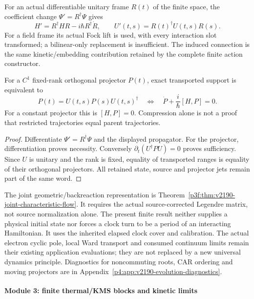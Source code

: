 \documentclass[12pt,a4paper]{article}
\begin{document}
\begin{corollary}
\label{p4:cor:v2190-frame-constraint-transport}
For an actual differentiable unitary frame \(R(t)\) of the finite space,
the coefficient change \(\Psi'=R^\dagger\Psi\) gives
\[
 H'=R^\dagger HR-i\hbar R^\dagger\dot R,
 \qquad U'(t,s)=R(t)^\dagger U(t,s)R(s).
\]
For a field frame its actual Fock lift is used, with every interaction slot
transformed; a bilinear-only replacement is insufficient.  The induced
connection is the same kinetic/embedding contribution retained by the
complete finite action constructor.

For a \(C^1\) fixed-rank orthogonal projector \(P(t)\), exact transported
support is equivalent to
\[
 \boxed{P(t)=U(t,s)P(s)U(t,s)^\dagger
 \quad\Longleftrightarrow\quad
 \dot P+\frac{i}{\hbar}[H,P]=0.}
\]
For a constant projector this is \([H,P]=0\).  Compression alone is not
a proof that restricted trajectories equal parent trajectories.
\end{corollary}
\begin{proof}
Differentiate \(\Psi'=R^\dagger\Psi\) and the displayed propagator.
For the projector, differentiation proves necessity.  Conversely
\(\partial_t(U^\dagger P U)=0\) proves sufficiency.  Since \(U\) is
unitary and the rank is fixed, equality of transported ranges is equality
of their orthogonal projectors.  All retained state, source and projector
jets remain part of the same word.
\end{proof}

The joint geometric/backreaction representation is
Theorem~\ref{p3f:thm:v2190-joint-characteristic-flow}.  It requires the
actual source-corrected Legendre matrix, not source normalization alone.
The present finite result neither supplies a physical initial state nor
forces a clock turn to be a period of an interacting Hamiltonian.  It
uses the inherited elapsed clock cover and calibration.  The actual
electron cyclic pole, local Ward transport and consumed continuum limits
remain their existing application evaluations; they are not replaced by
a new universal dynamics principle.  Diagnostics for noncommuting roots,
CAR ordering and moving projectors are in
Appendix~\ref{p4:app:v2190-evolution-diagnostics}.



\paragraph{Module 3: finite thermal/KMS blocks and kinetic limits}
\label{p4:sec:module-finite-thermal-kms}
\end{document}
